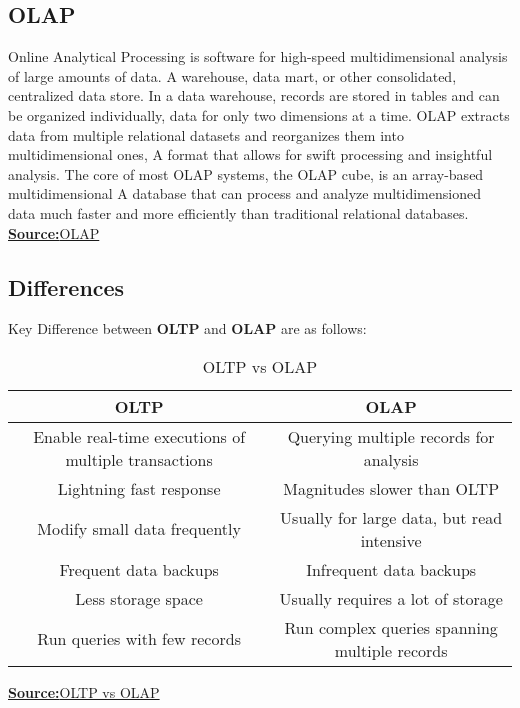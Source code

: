 \documentclass{article}
\newcounter{other}
\begin{document}
\subsection{OLAP}
Online Analytical Processing is software for high-speed multidimensional analysis of large amounts of data. A warehouse, data mart, 
or other consolidated, centralized data store. In a data warehouse, records are stored in tables and can be organized individually, 
data for only two dimensions at a time. OLAP extracts data from multiple relational datasets and reorganizes them into multidimensional ones, 
A format that allows for swift processing and insightful analysis. The core of most OLAP systems, the OLAP cube, is an array-based multidimensional 
A database that can process and analyze multidimensioned data much faster and more efficiently than traditional relational databases.\newline \newline
\textbf{\underline{Source:}}\hspace{\parindent}\href{https://www.ibm.com/cloud/learn/olap#:~:text=OLAP%20(for%20online%20analytical%20processing,other%20unified%2C%20centralized%20data%20store.}{OLAP}
\subsection{Differences}
Key Difference between \textbf{OLTP} and \textbf{OLAP} are as follows: 
\begin{center}
\begin{table}[ht]
\begin{tabular}{|c|c|}  
\hline  
\textbf{OLTP}&\textbf{OLAP}\\ \hline  
Enable real-time executions of multiple transactions&Querying multiple records for analysis\\ \hline
Lightning fast response&Magnitudes slower than OLTP\\ \hline
Modify small data frequently&Usually for large data, but read intensive\\ \hline
Frequent data backups&Infrequent data backups\\ \hline
Less storage space&Usually requires a lot of storage\\ \hline
Run queries with few records&Run complex queries spanning multiple records\\ \hline
\end{tabular}
\caption{OLTP vs OLAP}
\end{table}
\end{center}
\textbf{\underline{Source:}}\hspace{\parindent}\href{https://www.oracle.com/in/database/what-is-oltp/#:~:text=OLTP%20or%20Online%20Transaction%20Processing,sending%20text%20messages%2C%20for%20example.}{OLTP vs OLAP}
\end{document}
